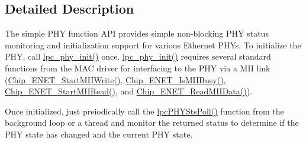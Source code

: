 \subsection{Detailed Description}
The simple P\+H\+Y function A\+P\+I provides simple non-\/blocking P\+H\+Y status monitoring and initialization support for various Ethernet P\+H\+Ys. To initialize the P\+H\+Y, call \hyperlink{group___b_o_a_r_d___p_h_y_ga9d09c9f5e31d5213b738ab80863776d5}{lpc\+\_\+phy\+\_\+init()} once. \hyperlink{group___b_o_a_r_d___p_h_y_ga9d09c9f5e31d5213b738ab80863776d5}{lpc\+\_\+phy\+\_\+init()} requires several standard functions from the M\+A\+C driver for interfacing to the P\+H\+Y via a M\+I\+I link (\hyperlink{group___e_n_e_t__17_x_x__40_x_x_gade9f31bbc04119bc06638fd8ce874f73}{Chip\+\_\+\+E\+N\+E\+T\+\_\+\+Start\+M\+I\+I\+Write()}, \hyperlink{group___e_n_e_t__17_x_x__40_x_x_ga2ae5389a2b99d6006980083d02667e07}{Chip\+\_\+\+E\+N\+E\+T\+\_\+\+Is\+M\+I\+I\+Busy()}, \hyperlink{group___e_n_e_t__17_x_x__40_x_x_gaca2166605d385fd5150f173cd33a3ac2}{Chip\+\_\+\+E\+N\+E\+T\+\_\+\+Start\+M\+I\+I\+Read()}, and \hyperlink{group___e_n_e_t__17_x_x__40_x_x_gab6d3dfc1cc671503532d00947f236e1d}{Chip\+\_\+\+E\+N\+E\+T\+\_\+\+Read\+M\+I\+I\+Data()}).

Once initialized, just preiodically call the \hyperlink{group___b_o_a_r_d___p_h_y_gab5a4203ab2c54fa3fb243e784f9b3ddc}{lpc\+P\+H\+Y\+Sts\+Poll()} function from the background loop or a thread and monitor the returned status to determine if the P\+H\+Y state has changed and the current P\+H\+Y state. 

